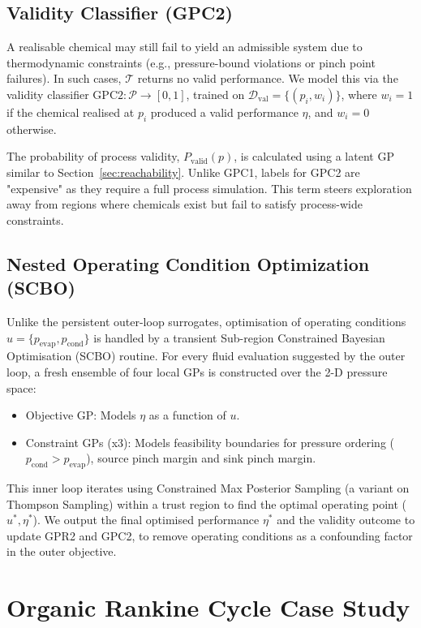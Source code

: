 \documentclass[preprint,12pt]{elsarticle}
\begin{document}
\subsection{Validity Classifier (GPC2)}
\label{sec:validity}

A realisable chemical may still fail to yield an admissible system due to thermodynamic constraints (e.g., pressure-bound violations or pinch point failures). In such cases, $\mathcal{T}$ returns no valid performance. We model this via the validity classifier $\mathrm{GPC2}: \mathcal{P} \rightarrow [0, 1]$, trained on $\mathcal{D}_{\text{val}} = \{ (p_i, w_i) \}$, where $w_i = 1$ if the chemical realised at $p_i$ produced a valid performance $\eta$, and $w_i = 0$ otherwise. 

The probability of process validity, $P_{\text{valid}}(p)$, is calculated using a latent GP similar to Section~\ref{sec:reachability}. Unlike GPC1, labels for GPC2 are "expensive" as they require a full process simulation. This term steers exploration away from regions where chemicals exist but fail to satisfy process-wide constraints.

\subsection{Nested Operating Condition Optimization (SCBO)}
\label{sec:sysopt}

Unlike the persistent outer-loop surrogates, optimisation of operating conditions $u = \{ p_\text{evap}, p_\text{cond}\}$ is handled by a transient Sub-region Constrained Bayesian Optimisation (SCBO) routine. For every fluid evaluation suggested by the outer loop, a fresh ensemble of four local GPs is constructed over the 2-D pressure space:
\begin{itemize}
    \item Objective GP: Models $\eta$ as a function of $u$.
    \item Constraint GPs (x3): Models feasibility boundaries for pressure ordering ($p_\text{cond} > p_\text{evap}$), source pinch margin and sink pinch margin.
\end{itemize}
This inner loop iterates using Constrained Max Posterior Sampling (a variant on Thompson Sampling) within a trust region to find the optimal operating point ($u^*, \eta^*$). We output the final optimised performance $\eta^*$ and the validity outcome to update GPR2 and GPC2, to remove operating conditions as a confounding factor in the outer objective.

\section{Organic Rankine Cycle Case Study}
\label{sec:ORC}
\end{document}
